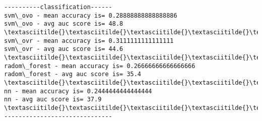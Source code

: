 \documentclass[11pt]{article}
\begin{document}
    \begin{Verbatim}[commandchars=\\\{\}]
----------classification------
svm\_ovo - mean accuracy is= 0.28888888888888886
svm\_ovo - avg auc score is= 48.8
\textasciitilde{}\textasciitilde{}\textasciitilde{}\textasciitilde{}\textasciitilde{}\textasciitilde{}\textasciitilde{}\textasciitilde{}\textasciitilde{}\textasciitilde{}\textasciitilde{}\textasciitilde{}\textasciitilde{}\textasciitilde{}\textasciitilde{}\textasciitilde{}\textasciitilde{}\textasciitilde{}\textasciitilde{}\textasciitilde{}\textasciitilde{}\textasciitilde{}\textasciitilde{}\textasciitilde{}\textasciitilde{}\textasciitilde{}\textasciitilde{}\textasciitilde{}\textasciitilde{}
svm\_ovr - mean accuracy is= 0.3111111111111111
svm\_ovr - avg auc score is= 44.6
\textasciitilde{}\textasciitilde{}\textasciitilde{}\textasciitilde{}\textasciitilde{}\textasciitilde{}\textasciitilde{}\textasciitilde{}\textasciitilde{}\textasciitilde{}\textasciitilde{}\textasciitilde{}\textasciitilde{}\textasciitilde{}\textasciitilde{}\textasciitilde{}\textasciitilde{}\textasciitilde{}\textasciitilde{}\textasciitilde{}\textasciitilde{}\textasciitilde{}\textasciitilde{}\textasciitilde{}\textasciitilde{}\textasciitilde{}\textasciitilde{}\textasciitilde{}\textasciitilde{}
radom\_forest - mean accuracy is= 0.26666666666666666
radom\_forest - avg auc score is= 35.4
\textasciitilde{}\textasciitilde{}\textasciitilde{}\textasciitilde{}\textasciitilde{}\textasciitilde{}\textasciitilde{}\textasciitilde{}\textasciitilde{}\textasciitilde{}\textasciitilde{}\textasciitilde{}\textasciitilde{}\textasciitilde{}\textasciitilde{}\textasciitilde{}\textasciitilde{}\textasciitilde{}\textasciitilde{}\textasciitilde{}\textasciitilde{}\textasciitilde{}\textasciitilde{}\textasciitilde{}\textasciitilde{}\textasciitilde{}\textasciitilde{}\textasciitilde{}\textasciitilde{}
nn - mean accuracy is= 0.2444444444444444
nn - avg auc score is= 37.9
\textasciitilde{}\textasciitilde{}\textasciitilde{}\textasciitilde{}\textasciitilde{}\textasciitilde{}\textasciitilde{}\textasciitilde{}\textasciitilde{}\textasciitilde{}\textasciitilde{}\textasciitilde{}\textasciitilde{}\textasciitilde{}\textasciitilde{}\textasciitilde{}\textasciitilde{}\textasciitilde{}\textasciitilde{}\textasciitilde{}\textasciitilde{}\textasciitilde{}\textasciitilde{}\textasciitilde{}\textasciitilde{}\textasciitilde{}\textasciitilde{}\textasciitilde{}\textasciitilde{}
------------------------------

    \end{Verbatim}
\end{document}
